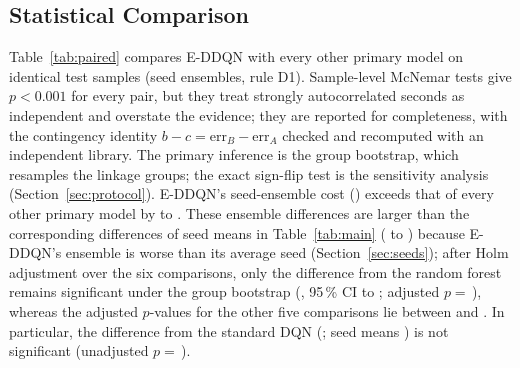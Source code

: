 \subsection{Statistical Comparison}
\label{sec:stats}
Table~\ref{tab:paired} compares E-DDQN with every other primary model on identical test samples (seed ensembles, rule D1). Sample-level McNemar tests give $p<0.001$ for every pair, but they treat \nSamplesEval{} strongly autocorrelated seconds as independent and overstate the evidence; they are reported for completeness, with the contingency identity $b-c=\mathrm{err}_B-\mathrm{err}_A$ checked and recomputed with an independent library. The primary inference is the group bootstrap, which resamples the \nGroupsEval{} linkage groups; the exact sign-flip test is the sensitivity analysis (Section~\ref{sec:protocol}). E-DDQN's seed-ensemble cost (\PHEnsEDDQNCost) exceeds that of every other primary model by \PairDOneECBCostDiff{} to \PairDOneRFCostDiff. These ensemble differences are larger than the corresponding differences of seed means in Table~\ref{tab:main} (\PHMeanDiffDQN{} to \PHMeanDiffRF) because E-DDQN's ensemble is worse than its average seed (Section~\ref{sec:seeds}); after Holm adjustment over the six comparisons, only the difference from the random forest remains significant under the group bootstrap (\PairDOneRFCostDiff, 95\,\% CI \PairDOneRFCostLo{} to \PairDOneRFCostHi; adjusted $p=$\,\PHHolmRF), whereas the adjusted $p$-values for the other five comparisons lie between \PHHolmECB{} and \PHHolmHGB. In particular, the difference from the standard DQN (\PairDOneDQNCostDiff; seed means \PHMeanDiffDQN) is not significant (unadjusted $p=$\,\PairDOneDQNPboot).

